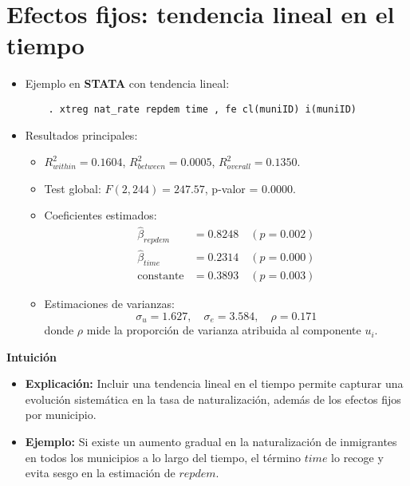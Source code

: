 \documentclass[12pt]{article}
\begin{document}
\section*{\noindent\textbf{Efectos fijos: tendencia lineal en el tiempo}}

\begin{itemize}
    \item Ejemplo en \textbf{STATA} con tendencia lineal:
    \begin{verbatim}
    . xtreg nat_rate repdem time , fe cl(muniID) i(muniID)
    \end{verbatim}
    
    \item Resultados principales:
    \begin{itemize}
        \item $R^2_{within} = 0.1604$, $R^2_{between} = 0.0005$, $R^2_{overall} = 0.1350$.
        \item Test global: $F(2,244) = 247.57$, p-valor = 0.0000.
        \item Coeficientes estimados:
        \[
        \begin{aligned}
        \hat{\beta}_{repdem} &= 0.8248 \quad (p = 0.002) \\
        \hat{\beta}_{time} &= 0.2314 \quad (p = 0.000) \\
        \text{constante} &= 0.3893 \quad (p = 0.003)
        \end{aligned}
        \]
        \item Estimaciones de varianzas:
        \[
        \sigma_u = 1.627, \quad \sigma_e = 3.584, \quad \rho = 0.171
        \]
        donde $\rho$ mide la proporción de varianza atribuida al componente $u_i$.
    \end{itemize}
\end{itemize}

\noindent\textbf{Intuición}
\begin{itemize}
    \item \textbf{Explicación:} Incluir una tendencia lineal en el tiempo permite capturar una evolución sistemática en la tasa de naturalización, además de los efectos fijos por municipio.
    \item \textbf{Ejemplo:} Si existe un aumento gradual en la naturalización de inmigrantes en todos los municipios a lo largo del tiempo, el término $time$ lo recoge y evita sesgo en la estimación de $repdem$.
\end{itemize}
\end{document}
